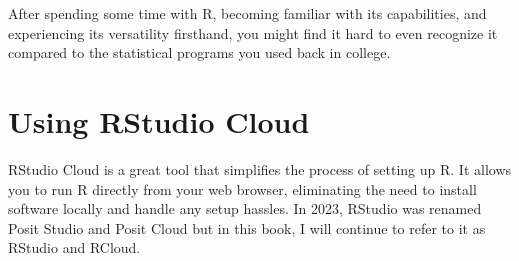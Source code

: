 \documentclass[
  letterpaper,
  DIV=11,
  numbers=noendperiod]{scrreprt}
\begin{document}
After spending some time with R, becoming familiar with its
capabilities, and experiencing its versatility firsthand, you might find
it hard to even recognize it compared to the statistical programs you
used back in college.

\hypertarget{using-rstudio-cloud}{%
\section{Using RStudio Cloud}\label{using-rstudio-cloud}}

RStudio Cloud is a great tool that simplifies the process of setting up
R. It allows you to run R directly from your web browser, eliminating
the need to install software locally and handle any setup hassles. In
2023, RStudio was renamed Posit Studio and Posit Cloud but in this book,
I will continue to refer to it as RStudio and RCloud.
\end{document}
